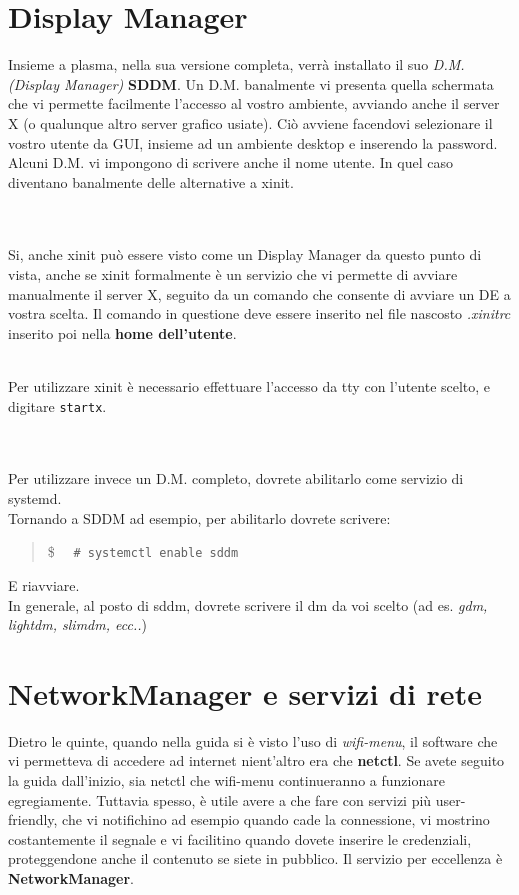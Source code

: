 \documentclass[twoside,italian]{book}
\newcommand{\code}[1]{\texttt{#1}}
\newcommand{\shellcode}[1]{\$$\quad$ \texttt{#1}}
\newcommand{\centcode}[1]{
	\begin{quote}
		\color{code}
		\shellcode{#1}
	\end{quote}
}
\newcommand{\nlinea}{
	\leavevmode
	\\
}
\begin{document}
		\section{Display Manager}
			Insieme a plasma, nella sua versione completa, verrà installato il suo\textit{ D.M. (Display Manager)} \textbf{SDDM}. Un D.M. banalmente vi presenta quella schermata che vi permette facilmente l'accesso al vostro ambiente, avviando anche il server X (o qualunque altro server grafico usiate). Ciò avviene facendovi selezionare il vostro utente da GUI, insieme ad un ambiente desktop e inserendo la password. Alcuni D.M. vi impongono di scrivere anche il nome utente. In quel caso diventano banalmente delle alternative a xinit.
			\nlinea
			\nlinea
			
			Si, anche xinit può essere visto come un Display Manager da questo punto di vista, anche se xinit formalmente è un servizio che vi permette di avviare manualmente il server X, seguito da un comando che consente di avviare un DE a vostra scelta. Il comando in questione deve essere inserito nel file nascosto \textit{.xinitrc} inserito poi nella \textbf{home dell'utente}.
			\nlinea
			Per utilizzare xinit è necessario effettuare l'accesso da tty con l'utente scelto, e digitare \code{startx}.
			\nlinea
			\nlinea
			Per utilizzare invece un D.M. completo, dovrete abilitarlo come servizio di systemd.\\
			Tornando a SDDM ad esempio, per abilitarlo dovrete scrivere: \centcode{\# systemctl enable sddm}E riavviare.\\ In generale, al posto di sddm, dovrete scrivere il dm da voi scelto (ad es. \textit{gdm, lightdm, slimdm, ecc..})
			
		\section{NetworkManager e servizi di rete}
			Dietro le quinte, quando nella guida si è visto l'uso di \textit{wifi-menu}, il software che vi permetteva di accedere ad internet nient'altro era che \textbf{netctl}. Se avete seguito la guida dall'inizio, sia netctl che wifi-menu continueranno a funzionare egregiamente. 
			Tuttavia spesso, è utile avere a che fare con servizi più user-friendly, che vi notifichino ad esempio quando cade la connessione, vi mostrino costantemente il segnale e vi facilitino quando dovete inserire le credenziali, proteggendone anche il contenuto se siete in pubblico.
			Il servizio per eccellenza è \textbf{NetworkManager}.
			
\end{document}
